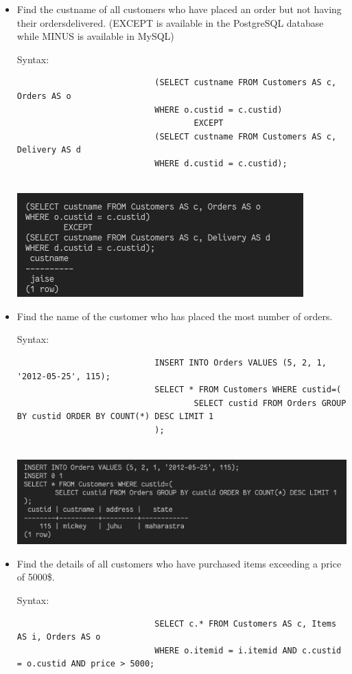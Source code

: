 \documentclass[13pt,oneside]{book}
\begin{document}
\begin{itemize}
							
							\item
							Find the custname of all customers who have placed an order but not having their
							 ordersdelivered. (EXCEPT is available in the PostgreSQL database while MINUS is
							 available in MySQL)
							 
							Syntax:
							\begin{verbatim}
							(SELECT custname FROM Customers AS c, Orders AS o
							WHERE o.custid = c.custid)
									EXCEPT
							(SELECT custname FROM Customers AS c, Delivery AS d 
							WHERE d.custid = c.custid);
							
							\end{verbatim}
							\includegraphics[]{img/p7/ss9.png}
							
							
							\item
							Find the name of the customer who has placed the most number of orders.
							 
							Syntax:
							\begin{verbatim}
							INSERT INTO Orders VALUES (5, 2, 1, '2012-05-25', 115);
							SELECT * FROM Customers WHERE custid=(
									SELECT custid FROM Orders GROUP BY custid ORDER BY COUNT(*) DESC LIMIT 1
							);
							
							\end{verbatim}
							\includegraphics[]{img/p7/ss10.png}
							
							
							\item
							Find the details of all customers who have purchased items exceeding a price of
							 5000\$.
							 
							Syntax:
							\begin{verbatim}
							SELECT c.* FROM Customers AS c, Items AS i, Orders AS o
							WHERE o.itemid = i.itemid AND c.custid = o.custid AND price > 5000;
							

\end{verbatim}
\end{itemize}
\end{document}
